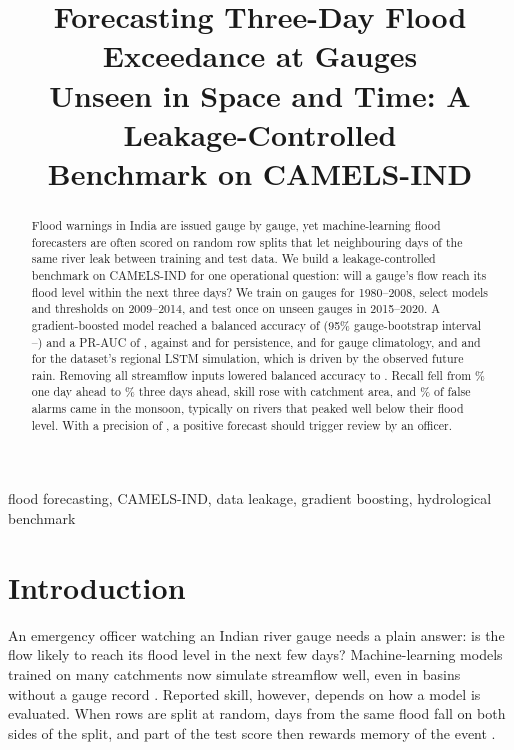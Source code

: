 \documentclass[conference]{IEEEtran}
\begin{document}
\title{Forecasting Three-Day Flood Exceedance at Gauges\\
Unseen in Space and Time: A Leakage-Controlled\\
Benchmark on CAMELS-IND}

\author{
}

\maketitle

\begin{abstract}
Flood warnings in India are issued gauge by gauge, yet machine-learning flood forecasters are often scored on random row splits that let neighbouring days of the same river leak between training and test data. We build a leakage-controlled benchmark on CAMELS-IND for one operational question: will a gauge's flow reach its flood level within the next three days? We train on \NTrainGauges{} gauges for 1980--2008, select models and thresholds on 2009--2014, and test once on \NTestGauges{} unseen gauges in 2015--2020. A gradient-boosted model reached a balanced accuracy of \XgbBA{} (95\% gauge-bootstrap interval \XgbBALo--\XgbBAHi) and a PR-AUC of \XgbPR, against \PersBA{} and \PersPR{} for persistence, \ClimBA{} and \ClimPR{} for gauge climatology, and \LstmBA{} and \LstmPR{} for the dataset's regional LSTM simulation, which is driven by the observed future rain. \LeakAbstract{} Removing all streamflow inputs lowered balanced accuracy to \NoFlowBA. Recall fell from \LeadOne\% one day ahead to \LeadThree\% three days ahead, skill rose with catchment area, and \FpMonsoonPct\% of false alarms came in the monsoon, typically on rivers that peaked well below their flood level. With a precision of \XgbPrec, a positive forecast should trigger review by an officer.
\end{abstract}

\begin{IEEEkeywords}
flood forecasting, CAMELS-IND, data leakage, gradient boosting, hydrological benchmark
\end{IEEEkeywords}

\section{Introduction}
An emergency officer watching an Indian river gauge needs a plain answer: is the flow likely to reach its flood level in the next few days? Machine-learning models trained on many catchments now simulate streamflow well, even in basins without a gauge record \cite{Kratzert2019a,Kratzert2019b,Nearing2024}. Reported skill, however, depends on how a model is evaluated. When rows are split at random, days from the same flood fall on both sides of the split, and part of the test score then rewards memory of the event \cite{Kapoor2023,Roberts2017}.
\end{document}
